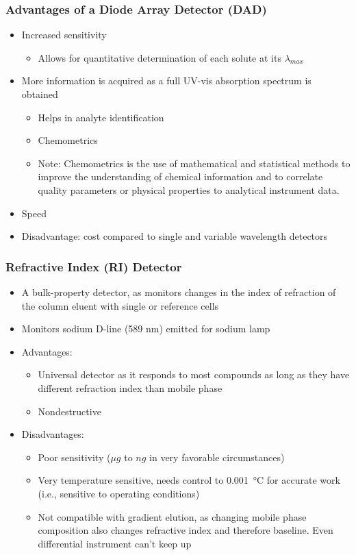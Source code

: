 \documentclass[a4paper, 12pt]{article}
\begin{document}
\subsubsection{Advantages of a Diode Array Detector (DAD)}

\begin{itemize}
	\item Increased sensitivity
	\begin{itemize}
		\item Allows for quantitative determination of each solute at its $\lambda{}_{max}$
	\end{itemize}
	\item More information is acquired as a full UV-vis absorption spectrum is obtained
	\begin{itemize}
		\item Helps in analyte identification
		\item Chemometrics
		\item Note: Chemometrics is the use of mathematical and statistical methods to improve the understanding of chemical information and to correlate quality parameters or physical properties to analytical instrument data.
	\end{itemize}
	\item Speed
	\item Disadvantage: cost compared to single and variable wavelength detectors
\end{itemize}

\subsubsection{Refractive Index (RI) Detector}

\begin{itemize}
	\item A bulk-property detector, as monitors changes in the index of refraction of the column eluent with single or reference cells
	\item Monitors sodium D-line (589 nm) emitted for sodium lamp
	\item Advantages:
	\begin{itemize}
		\item Universal detector as it responds to most compounds as long as they have different refraction index than mobile phase
		\item Nondestructive
	\end{itemize}
	\item Disadvantages:
	\begin{itemize}
		\item Poor sensitivity ($\mu{}g$ to $ng$ in very favorable circumstances)
		\item Very temperature sensitive, needs control to \SI{0.001}{\celsius} for accurate work (i.e., sensitive to operating conditions)
		\item Not compatible with gradient elution, as changing mobile phase composition also changes refractive index and therefore baseline. Even differential instrument can’t keep up
	\end{itemize}
\end{itemize}
\end{document}
